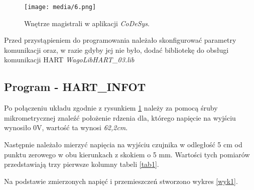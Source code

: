 \documentclass{article}
\begin{document}
\vspace{1em}
\begin{figure}[ht]
    \centering
    \texttt{[image: media/6.png]}
    \caption{Wnętrze magistrali w aplikacji \textit{CoDeSys}.}
    \label{fig1}
\end{figure}

Przed przystąpieniem do programowania należało skonfigurować parametry komunikacji oraz, w razie gdyby jej nie było, dodać bibliotekę do obsługi komunikacji HART \textit{WagoLibHART\_03.lib}
\newpage


\subsection{Program - HART\_INFOT} \label{1a}
Po połączeniu układu zgodnie z rysunkiem \ref{fig1} należy za pomocą śruby mikrometrycznej znaleźć położenie rdzenia dla, którego napięcie na wyjściu wynosiło 0V, wartość ta wynosi \textit{62,2cm}. 



Następnie należało mierzyć napięcia na wyjściu czujnika w odległość 5 cm od punktu zerowego w obu kierunkach z skokiem o 5 mm. Wartości tych pomiarów przedstawiają trzy pierwsze kolumny tabeli \ref{tab1}.

Na podstawie zmierzonych napięć i przemieszczeń stworzono wykres \ref{wyk1}.
\end{document}
